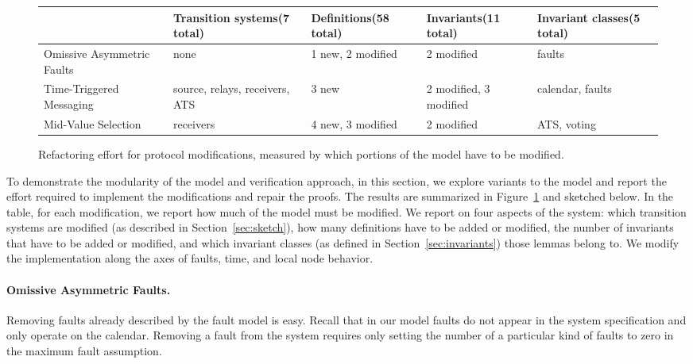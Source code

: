 \documentclass{llncs/llncs}
\begin{document}
{\begin{figure}
  \centering
  \begin{tabular}{|p{3cm}|p{2cm}|p{2cm}|p{2cm}|p{2cm}|}
  \hline
                                  & Transition systems\linebreak (7 total)  &Definitions\linebreak (58 total) & Invariants\linebreak (11 total) & Invariant classes\linebreak (5 total) \\
  \hline \hline
  Omissive Asymmetric Faults       & none      & 1 new, 2 modified & 2 modified & faults             \\
  \hline
  Time-Triggered Messaging        & source, relays, receivers, ATS & 3 new & 2 modified, 3 modified & calendar, faults \\
  \hline
  Mid-Value Selection & receivers & 4 new, 3 modified & 2 modified & ATS, voting \\
  \hline
  \end{tabular}
  \caption{Refactoring effort for protocol modifications, measured by which portions of the model have to be modified.}
  \label{fig:effort}
\end{figure}

To demonstrate the modularity of the model and verification approach, in this section, we explore variants to the model and report the effort required to implement the modifications and repair the proofs. The results are summarized in Figure~\ref{fig:effort} and sketched below. In the table, for each modification, we report how much of the model must be modified. We report on four aspects of the system: which transition systems are modified (as described in Section~\ref{sec:sketch}), how many definitions have to be added or modified, the number of invariants that have to be added or modified, and which invariant classes (as defined in Section~\ref{sec:invariants}) those lemmas belong to. We modify the implementation along the axes of faults, time, and local node behavior.

\paragraph{Omissive Asymmetric Faults.}
Removing faults already described by the fault model is easy. Recall that in our model faults do not appear in the system specification and only operate on the calendar. Removing a fault from the system requires only setting the number of a particular kind of faults to zero in the maximum fault assumption.

}
\end{document}
